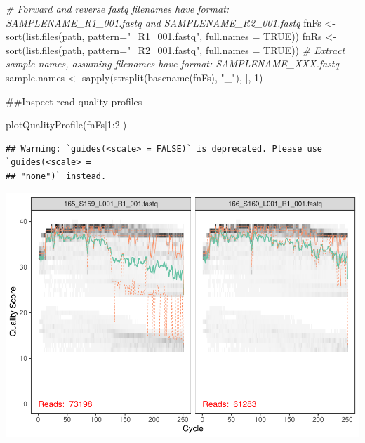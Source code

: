 \documentclass[
]{article}
\newenvironment{Shaded}{\begin{snugshade}}{\end{snugshade}}
\newcommand{\AttributeTok}[1]{\textcolor[rgb]{0.77,0.63,0.00}{#1}}
\newcommand{\CommentTok}[1]{\textcolor[rgb]{0.56,0.35,0.01}{\textit{#1}}}
\newcommand{\ConstantTok}[1]{\textcolor[rgb]{0.00,0.00,0.00}{#1}}
\newcommand{\DecValTok}[1]{\textcolor[rgb]{0.00,0.00,0.81}{#1}}
\newcommand{\FunctionTok}[1]{\textcolor[rgb]{0.00,0.00,0.00}{#1}}
\newcommand{\NormalTok}[1]{#1}
\newcommand{\OtherTok}[1]{\textcolor[rgb]{0.56,0.35,0.01}{#1}}
\newcommand{\SpecialCharTok}[1]{\textcolor[rgb]{0.00,0.00,0.00}{#1}}
\newcommand{\StringTok}[1]{\textcolor[rgb]{0.31,0.60,0.02}{#1}}
\begin{document}
\begin{Shaded}
\begin{Highlighting}[]
\CommentTok{\# Forward and reverse fastq filenames have format: SAMPLENAME\_R1\_001.fastq and SAMPLENAME\_R2\_001.fastq}
\NormalTok{fnFs }\OtherTok{\textless{}{-}} \FunctionTok{sort}\NormalTok{(}\FunctionTok{list.files}\NormalTok{(path, }\AttributeTok{pattern=}\StringTok{"\_R1\_001.fastq"}\NormalTok{, }\AttributeTok{full.names =} \ConstantTok{TRUE}\NormalTok{))}
\NormalTok{fnRs }\OtherTok{\textless{}{-}} \FunctionTok{sort}\NormalTok{(}\FunctionTok{list.files}\NormalTok{(path, }\AttributeTok{pattern=}\StringTok{"\_R2\_001.fastq"}\NormalTok{, }\AttributeTok{full.names =} \ConstantTok{TRUE}\NormalTok{))}
\CommentTok{\# Extract sample names, assuming filenames have format: SAMPLENAME\_XXX.fastq}
\NormalTok{sample.names }\OtherTok{\textless{}{-}} \FunctionTok{sapply}\NormalTok{(}\FunctionTok{strsplit}\NormalTok{(}\FunctionTok{basename}\NormalTok{(fnFs), }\StringTok{"\_"}\NormalTok{), }\StringTok{\textasciigrave{}}\AttributeTok{[}\StringTok{\textasciigrave{}}\NormalTok{, }\DecValTok{1}\NormalTok{)}
\end{Highlighting}
\end{Shaded}

\#\#Inspect read quality profiles

\begin{Shaded}
\begin{Highlighting}[]
\FunctionTok{plotQualityProfile}\NormalTok{(fnFs[}\DecValTok{1}\SpecialCharTok{:}\DecValTok{2}\NormalTok{])}
\end{Highlighting}
\end{Shaded}

\begin{verbatim}
## Warning: `guides(<scale> = FALSE)` is deprecated. Please use `guides(<scale> =
## "none")` instead.
\end{verbatim}

\includegraphics{BlackGillShrimpDADA2_files/figure-latex/unnamed-chunk-2-1.pdf}
\end{document}
